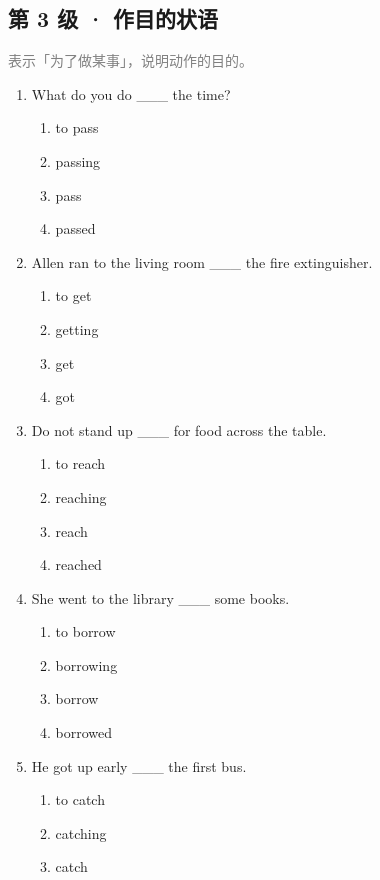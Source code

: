 \documentclass[11pt,a4paper]{ctexart}
\begin{document}
\subsection*{第 3 级 · 作目的状语}
\noindent\textcolor{gray}{表示「为了做某事」，说明动作的目的。}\par\smallskip
\begin{enumerate}[leftmargin=*,itemsep=4pt]
\item What do you do \_\_\_ the time?
\begin{enumerate}[label=\Alph*.,leftmargin=2em,itemsep=1pt,topsep=2pt]
\item to pass
\item passing
\item pass
\item passed
\end{enumerate}
\item Allen ran to the living room \_\_\_ the fire extinguisher.
\begin{enumerate}[label=\Alph*.,leftmargin=2em,itemsep=1pt,topsep=2pt]
\item to get
\item getting
\item get
\item got
\end{enumerate}
\item Do not stand up \_\_\_ for food across the table.
\begin{enumerate}[label=\Alph*.,leftmargin=2em,itemsep=1pt,topsep=2pt]
\item to reach
\item reaching
\item reach
\item reached
\end{enumerate}
\item She went to the library \_\_\_ some books.
\begin{enumerate}[label=\Alph*.,leftmargin=2em,itemsep=1pt,topsep=2pt]
\item to borrow
\item borrowing
\item borrow
\item borrowed
\end{enumerate}
\item He got up early \_\_\_ the first bus.
\begin{enumerate}[label=\Alph*.,leftmargin=2em,itemsep=1pt,topsep=2pt]
\item to catch
\item catching
\item catch

\end{enumerate}
\end{enumerate}
\end{document}
